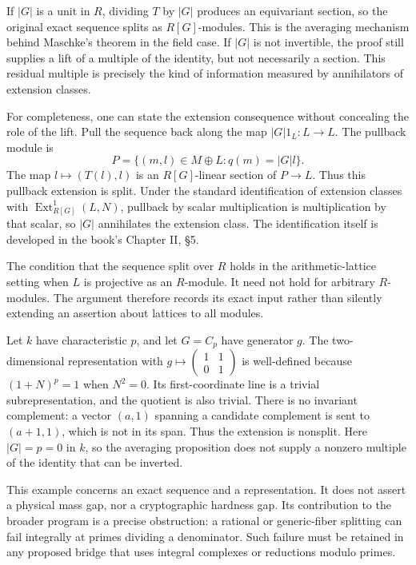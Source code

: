 If $|G|$ is a unit in $R$, dividing $T$ by $|G|$ produces
an equivariant section, so the original exact sequence splits
as $R[G]$-modules. This is the averaging mechanism behind
Maschke's theorem in the field case. If $|G|$ is not invertible,
the proof still supplies a lift of a multiple of the identity,
but not necessarily a section. This residual multiple is
precisely the kind of information measured by annihilators of
extension classes.

For completeness, one can state the extension consequence
without concealing the role of the lift. Pull the sequence back
along the map $|G|1_L:L\to L$. The pullback module is
\[
 P=\{(m,l)\in M\oplus L:q(m)=|G|l\}.
\]
The map $l\mapsto(T(l),l)$ is an $R[G]$-linear section of
$P\to L$. Thus this pullback extension is split. Under the
standard identification of extension classes with
$\operatorname{Ext}^1_{R[G]}(L,N)$, pullback by scalar
multiplication is multiplication by that scalar, so $|G|$
annihilates the extension class. The identification itself is
developed in the book's Chapter II, \S5.

The condition that the sequence split over $R$ holds in the
arithmetic-lattice setting when $L$ is projective as an
$R$-module. It need not hold for arbitrary $R$-modules. The
argument therefore records its exact input rather than
silently extending an assertion about lattices to all modules.

\begin{example}
Let $k$ have characteristic $p$, and let $G=C_p$ have generator
$g$. The two-dimensional representation with
$g\mapsto\left(\begin{smallmatrix}1&1\\0&1\end{smallmatrix}\right)$
is well-defined because $(1+N)^p=1$ when $N^2=0$.
Its first-coordinate line is a trivial subrepresentation,
and the quotient is also trivial. There is no invariant
complement: a vector $(a,1)$ spanning a candidate complement
is sent to $(a+1,1)$, which is not in its span. Thus the
extension is nonsplit. Here $|G|=p=0$ in $k$, so the
averaging proposition does not supply a nonzero multiple of
the identity that can be inverted.
\end{example}

This example concerns an exact sequence and a representation.
It does not assert a physical mass gap, nor a cryptographic
hardness gap. Its contribution to the broader program is a
precise obstruction: a rational or generic-fiber splitting
can fail integrally at primes dividing a denominator. Such
failure must be retained in any proposed bridge that uses
integral complexes or reductions modulo primes.

